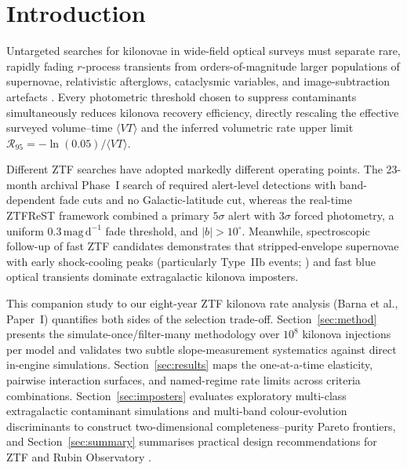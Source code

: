 \documentclass[twocolumn]{aastex631}
\newcommand{\vteff}{\langle VT\rangle}
\begin{document}

\section{Introduction}
\label{sec:intro}

Untargeted searches for kilonovae in wide-field optical surveys must separate rare, rapidly fading $r$-process transients from orders-of-magnitude larger populations of supernovae, relativistic afterglows, cataclysmic variables, and image-subtraction artefacts \citep{Doctor2017, Andreoni2020, Andreoni2021}. Every photometric threshold chosen to suppress contaminants simultaneously reduces kilonova recovery efficiency, directly rescaling the effective surveyed volume--time $\vteff$ and the inferred volumetric rate upper limit $\mathcal{R}_{95} = -\ln(0.05)/\vteff$.

Different ZTF searches have adopted markedly different operating points. The 23-month archival Phase~I search of \citet{Andreoni2020} required alert-level detections with band-dependent fade cuts and no Galactic-latitude cut, whereas the real-time ZTFReST framework \citep{Andreoni2021} combined a primary $5\sigma$ alert with $3\sigma$ forced photometry, a uniform $0.3\,\mathrm{mag\,d}^{-1}$ fade threshold, and $|b| > 10^\circ$. Meanwhile, spectroscopic follow-up of fast ZTF candidates demonstrates that stripped-envelope supernovae with early shock-cooling peaks (particularly Type~IIb events; \citealt{Piro2021, Barna2025}) and fast blue optical transients \citep[FBOTs;][]{Ho2023} dominate extragalactic kilonova imposters.

This companion study to our eight-year ZTF kilonova rate analysis (Barna et al., Paper~I) quantifies both sides of the selection trade-off. Section~\ref{sec:method} presents the simulate-once/filter-many methodology over $10^8$ kilonova injections per model and validates two subtle slope-measurement systematics against direct in-engine simulations. Section~\ref{sec:results} maps the one-at-a-time elasticity, pairwise interaction surfaces, and named-regime rate limits across \GridPointsTotal{} criteria combinations. Section~\ref{sec:imposters} evaluates exploratory multi-class extragalactic contaminant simulations and multi-band colour-evolution discriminants to construct two-dimensional completeness--purity Pareto frontiers, and Section~\ref{sec:summary} summarises practical design recommendations for ZTF and Rubin Observatory \citep{Andreoni2022Rubin}.
\end{document}
